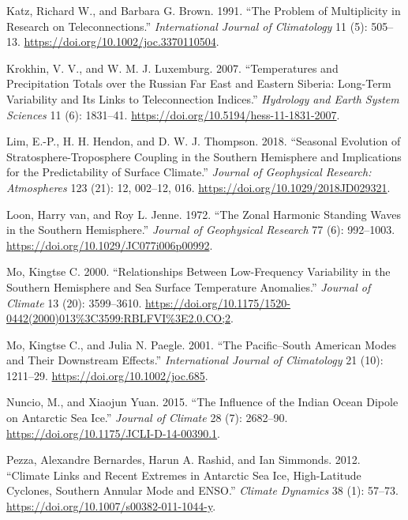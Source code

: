 \documentclass[smallextended]{svjour3}       %
\newlength{\cslhangindent}
\newlength{\cslentryspacingunit} %
\newenvironment{CSLReferences}[2] %
 {%
  \setlength{\parindent}{0pt}
  \ifodd #1
  \let\oldpar\par
  \def\par{\hangindent=\cslhangindent\oldpar}
  \fi
  \setlength{\parskip}{#2\cslentryspacingunit}
 }%
 {}
\begin{document}
\begin{CSLReferences}{1}{0}
\leavevmode{}%
Katz, Richard W., and Barbara G. Brown. 1991. {``The Problem of Multiplicity in Research on Teleconnections.''} \emph{International Journal of Climatology} 11 (5): 505--13. \url{https://doi.org/10.1002/joc.3370110504}.

\leavevmode{}%
Krokhin, V. V., and W. M. J. Luxemburg. 2007. {``Temperatures and Precipitation Totals over the {Russian Far East} and {Eastern Siberia}: Long-Term Variability and Its Links to Teleconnection Indices.''} \emph{Hydrology and Earth System Sciences} 11 (6): 1831--41. \url{https://doi.org/10.5194/hess-11-1831-2007}.

\leavevmode{}%
Lim, E.-P., H. H. Hendon, and D. W. J. Thompson. 2018. {``Seasonal {Evolution} of {Stratosphere-Troposphere Coupling} in the {Southern Hemisphere} and {Implications} for the {Predictability} of {Surface Climate}.''} \emph{Journal of Geophysical Research: Atmospheres} 123 (21): 12, 002--12, 016. \url{https://doi.org/10.1029/2018JD029321}.

\leavevmode{}%
Loon, Harry van, and Roy L. Jenne. 1972. {``The Zonal Harmonic Standing Waves in the Southern Hemisphere.''} \emph{Journal of Geophysical Research} 77 (6): 992--1003. \url{https://doi.org/10.1029/JC077i006p00992}.

\leavevmode{}%
Mo, Kingtse C. 2000. {``Relationships Between {Low-Frequency Variability} in the {Southern Hemisphere} and {Sea Surface Temperature Anomalies}.''} \emph{Journal of Climate} 13 (20): 3599--3610. \url{https://doi.org/10.1175/1520-0442(2000)013\%3C3599:RBLFVI\%3E2.0.CO;2}.

\leavevmode{}%
Mo, Kingtse C., and Julia N. Paegle. 2001. {``The {Pacific}--{South American} Modes and Their Downstream Effects.''} \emph{International Journal of Climatology} 21 (10): 1211--29. \url{https://doi.org/10.1002/joc.685}.

\leavevmode{}%
Nuncio, M., and Xiaojun Yuan. 2015. {``The {Influence} of the {Indian Ocean Dipole} on {Antarctic Sea Ice}.''} \emph{Journal of Climate} 28 (7): 2682--90. \url{https://doi.org/10.1175/JCLI-D-14-00390.1}.

\leavevmode{}%
Pezza, Alexandre Bernardes, Harun A. Rashid, and Ian Simmonds. 2012. {``Climate Links and Recent Extremes in Antarctic Sea Ice, High-Latitude Cyclones, {Southern Annular Mode} and {ENSO}.''} \emph{Climate Dynamics} 38 (1): 57--73. \url{https://doi.org/10.1007/s00382-011-1044-y}.


\end{CSLReferences}
\end{document}
